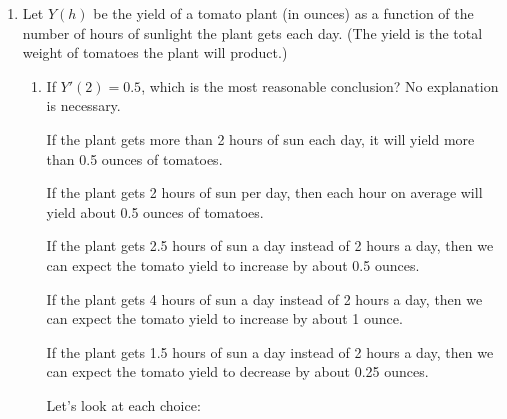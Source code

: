 \documentclass{article}
\theoremstyle{theorem}
\begin{document}
\begin{enumerate}
\item {}  %

  Let $Y(h)$ be the yield of a tomato plant (in ounces) as a function of the number of hours of sunlight the plant gets each day. (The yield is the total weight of tomatoes the plant will product.) 
  \begin{enumerate}

  \item
    \begin{problem}
      If $Y' (2) = 0.5$, which is the most reasonable conclusion? No explanation is necessary.

      \begin{altenumerate}[label=\protect\maybecircle{\Alph*.}]
      \plainitem If the plant gets more than 2 hours of sun each day, it will yield more than 0.5 ounces of tomatoes.

      \plainitem If the plant gets 2 hours of sun per day, then each hour on average will yield about 0.5 ounces of tomatoes.

      \plainitem If the plant gets 2.5 hours of sun a day instead of 2 hours a day, then we can expect the tomato yield to increase by about 0.5 ounces.

      \plainitem If the plant gets 4 hours of sun a day instead of 2 hours a day, then we can expect the tomato yield to increase by about 1 ounce.

      \circleitem If the plant gets 1.5 hours of sun a day instead of 2 hours a day, then we can expect the tomato yield to decrease by about 0.25 ounces.
      \end{altenumerate}
    \end{problem}

    \begin{solution}
      Let's look at each choice:
\end{solution}
\end{enumerate}
\end{enumerate}
\end{document}
